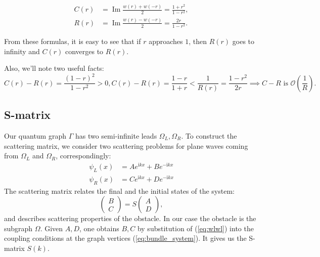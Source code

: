 \documentclass{birkjour}
\theoremstyle{definition}
\theoremstyle{remark}
\numberwithin{equation}{section}
\begin{document}
\begin{equation}\label{eq:c_and_r}
\begin{aligned}
   C(r) &= \operatorname{Im} \frac{w(r) + w(-r)}{2} =
   \frac{1 + r^2}{1 - r^2},
\\ R(r) &= \operatorname{Im} \frac{w(r) - w(-r)}{2} =
\frac{2 r}{1 - r^2}.
\end{aligned}
\end{equation}

From these formulas,  it is easy to see that if $r$ approaches
$1$, then $R(r)$ goes to infinity and $C(r)$ converges to $R(r)$.

Also, we'll note two useful facts:
\begin{subequations}
\begin{equation}
C(r) - R(r) = \frac{(1 - r)^2}{1 - r^2} > 0,
\label{eq:cr_positive}
\end{equation}
\begin{equation}
C(r) - R(r) = \frac{1 - r}{1 + r} < \frac{1}{R(r)} = \frac{1 -
r^2}{2 r} \implies C - R \text{\ is\ }
\mathcal{O}\left(\frac{1}{R}\right).
\label{eq:cr_small}
\end{equation}
\end{subequations}


\subsection{S-matrix}\label{sec:smatrix}
Our quantum graph $\Gamma$ has two semi-infinite leads
$\Omega_L,\Omega_R$. To construct the scattering matrix, we
consider two scattering problems for plane waves coming from
$\Omega_L$ and $\Omega_R$, correspondingly:
\begin{equation}\label{eq:wlwl}
\begin{aligned}
   \psi_L(x) &= A e^{\mathrm{i} k x} + B e^{-\mathrm{i} k x}
\\ \psi_R(x) &= C e^{\mathrm{i} k x} + D e^{-\mathrm{i} k x}
\end{aligned}
\end{equation}
The scattering matrix relates the final and the initial states of
the system:
\begin{equation}\label{eq:smatrix}
\begin{pmatrix} B \\ C \end{pmatrix} = S \begin{pmatrix} A \\
D \end{pmatrix},
\end{equation}
and describes scattering properties of the obstacle. In our case
the obstacle is the subgraph $\Omega$. Given $A,D$, one obtains
$B,C$ by substitution of (\ref{eq:wlwl}) into the coupling
conditions at the graph vertices (\ref{eq:bundle_system}). It
gives us the S-matrix $S(k)$.
\end{document}
